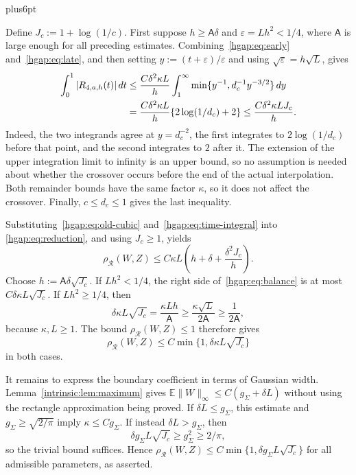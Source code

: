 \documentclass[11pt,letterpaper,twoside,leqno]{article}
\makeatletter
\theoremstyle{bookplain}
\theoremstyle{bookremark}
\renewenvironment{proof}[1][\proofname]{\par
  \pushQED{\qed}\normalfont\topsep6pt plus6pt\relax
  \trivlist\item[\hskip\labelsep\bfseries #1\@addpunct{.}]\ignorespaces
}{\popQED\endtrivlist\@endpefalse}
\newcommand{\E}{\mathbb E}
\newcommand{\rh}{\rho_{\mathcal R}}
\newcommand{\dd}{\,d}
\makeatother
\begin{document}
\begin{proof}[Proof of Corollary~\ref{cor:positive-correlation-gap}]
Define $J_c:=1+\log(1/c)$. First suppose $h\ge\mathsf A\delta$ and
$\varepsilon=Lh^2<1/4$, where $\mathsf A$ is large enough for all preceding estimates.
Combining~\eqref{hgap:eq:early} and~\eqref{hgap:eq:late}, and then setting
$y:=(t+\varepsilon)/\varepsilon$ and using
$\sqrt\varepsilon=h\sqrt L$, gives
\begin{align}
 \int_0^1|R_{4,a,h}(t)|\dd t
 &\le\frac{C\delta^2\kappa L}h
    \int_1^\infty\min\{y^{-1},d_c^{-1}y^{-3/2}\}\dd y\notag\\
 &=\frac{C\delta^2\kappa L}h
                      \{2\log(1/d_c)+2\}
 \le\frac{C\delta^2\kappa LJ_c}{h}.              \label{hgap:eq:time-integral}
\end{align}
Indeed, the two integrands agree at $y=d_c^{-2}$, the first integrates
to $2\log(1/d_c)$ before that point, and the second integrates to $2$
after it. The extension of the upper integration limit to infinity
is an upper bound, so no assumption is needed about whether the
crossover occurs before the end of the actual interpolation.
Both remainder bounds have the same factor $\kappa$, so it does not
affect the crossover. Finally, $c\le d_c\le1$ gives the last inequality.

Substituting~\eqref{hgap:eq:old-cubic} and~\eqref{hgap:eq:time-integral} into
\eqref{hgap:eq:reduction}, and using $J_c\ge1$, yields
\begin{equation}\label{hgap:eq:balance}
 \rh(W,Z)\le C\kappa L\left(h+\delta+\frac{\delta^2J_c}{h}\right).
\end{equation}
Choose $h:=\mathsf A\delta\sqrt{J_c}$. If $Lh^2<1/4$, the right
side of~\eqref{hgap:eq:balance} is at most $C\delta\kappa L\sqrt{J_c}$.
If $Lh^2\ge1/4$, then
\[
 \delta\kappa L\sqrt{J_c}
 =\frac{\kappa Lh}{\mathsf A}
 \ge\frac{\kappa\sqrt L}{2\mathsf A}\ge\frac1{2\mathsf A},
\]
because $\kappa,L\ge1$. The bound $\rh(W,Z)\le1$ therefore gives
\[
 \rh(W,Z)\le C\min\{1,\delta\kappa L\sqrt{J_c}\}
\]
in both cases.

It remains to express the boundary coefficient in terms of Gaussian
width. Lemma~\ref{intrinsic:lem:maximum} gives
$\E\|W\|_\infty\le C(g_\Sigma+\delta L)$ without using the rectangle
approximation being proved. If $\delta L\le g_\Sigma$, this estimate
and $g_\Sigma\ge\sqrt{2/\pi}$ imply $\kappa\le Cg_\Sigma$.
If instead $\delta L>g_\Sigma$, then
\[
 \delta g_\Sigma L\sqrt{J_c}\ge g_\Sigma^2\ge2/\pi,
\]
so the trivial bound suffices. Hence
$\rh(W,Z)\le C\min\{1,\delta g_\Sigma L\sqrt{J_c}\}$ for all
admissible parameters, as asserted.
\end{proof}
\end{document}
